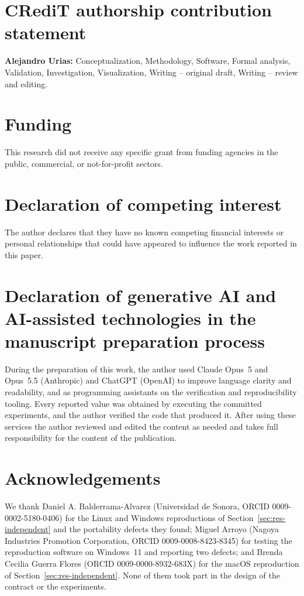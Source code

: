 \documentclass[preprint,3p,11pt,authoryear]{elsarticle}
\begin{document}
\section*{CRediT authorship contribution statement}

\textbf{Alejandro Urias:} Conceptualization, Methodology, Software, Formal analysis,
Validation, Investigation, Visualization, Writing -- original draft,
Writing -- review and editing.

\section*{Funding}

This research did not receive any specific grant from funding agencies in the
public, commercial, or not-for-profit sectors.

\section*{Declaration of competing interest}

The author declares that they have no known competing financial interests or
personal relationships that could have appeared to influence the work reported
in this paper.

\section*{Declaration of generative AI and AI-assisted technologies in the manuscript preparation process}

During the preparation of this work, the author used Claude Opus~5 and Opus~5.5 (Anthropic)
and ChatGPT (OpenAI) to improve language clarity and readability, and as
programming assistants on the verification and reproducibility tooling. Every
reported value was obtained by executing the committed experiments, and the
author verified the code that produced it. After using these services the author reviewed and edited the
content as needed and takes full responsibility for the content of the
publication.

\section*{Acknowledgements}

We thank Daniel A. Balderrama-Alvarez (Universidad de Sonora, ORCID
0009-0002-5180-0406) for the Linux and Windows reproductions of
Section~\ref{sec:res-independent} and the portability defects they found;
Miguel Arroyo (Nagoya Industries Promotion Corporation, ORCID
0009-0008-8423-8345) for testing the reproduction software on Windows~11 and
reporting two defects; and Brenda Cecilia Guerra Flores (ORCID
0009-0000-8932-683X) for the macOS reproduction of
Section~\ref{sec:res-independent}. None of them took part in the design of the
contract or the experiments.



\end{document}
